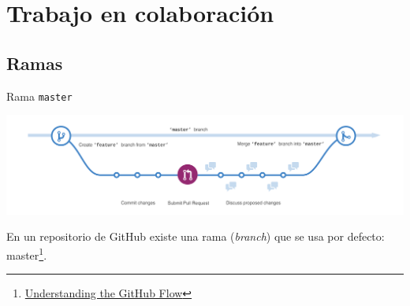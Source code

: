 \documentclass[xcolor={usenames,svgnames,dvipsnames}]{beamer}
\begin{document}
\section{Trabajo en colaboración}
\label{sec:org4fc8dc4}
\subsection{Ramas}
\label{sec:org35eea5e}

\begin{frame}[fragile,label={sec:orge495c86}]{Rama \texttt{master}}
 \begin{center}
\includegraphics[width=.9\linewidth]{figs/branching.png}
\end{center}

En un repositorio de GitHub existe una rama (\emph{branch}) que se usa por defecto: \alert{master}\footnote{\href{https://guides.github.com/introduction/flow/}{Understanding the GitHub Flow}}.
\end{frame}
\end{document}
